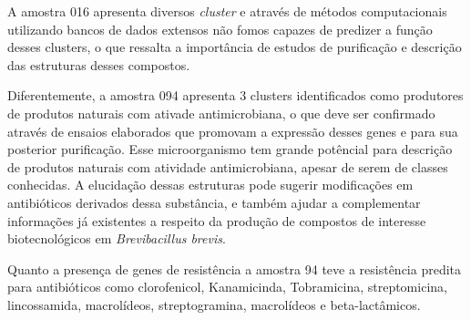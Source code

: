 A amostra 016 apresenta diversos \textit{cluster} e através de métodos computacionais utilizando bancos
de dados extensos não fomos capazes de predizer a função desses clusters, o que ressalta a importância de 
estudos de purificação e descrição das estruturas desses compostos.

Diferentemente, a amostra 094 apresenta 3 clusters identificados como produtores de produtos naturais com
ativade antimicrobiana, o que deve ser confirmado através de ensaios elaborados que promovam a expressão
desses genes e para sua posterior purificação. Esse microorganismo tem grande potêncial para descrição de 
produtos naturais com atividade antimicrobiana, apesar de serem de classes conhecidas. A elucidação dessas
estruturas pode sugerir modificações em antibióticos derivados dessa substância, e também ajudar a complementar
informações já existentes a respeito da produção de compostos de interesse biotecnológicos em \textit{Brevibacillus brevis}.

Quanto a presença de genes de resistência a amostra 94 teve a resistência predita para antibióticos como clorofenicol,
Kanamicinda, Tobramicina, streptomicina, lincossamida, macrolídeos, streptogramina, macrolídeos e beta-lactâmicos. 

